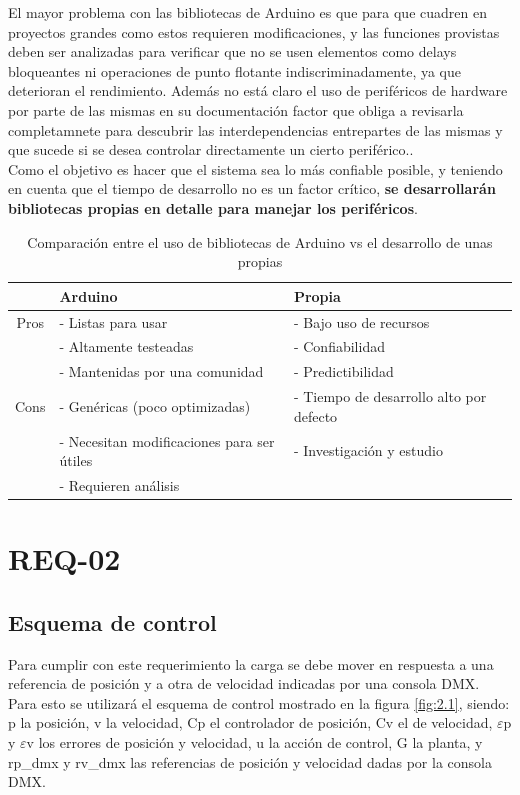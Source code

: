 El mayor problema con las bibliotecas de Arduino es que para que cuadren en proyectos grandes como estos requieren modificaciones, y las funciones provistas deben ser analizadas para verificar que no se usen elementos como delays bloqueantes ni operaciones de punto flotante indiscriminadamente, ya que deterioran el rendimiento. Además no está claro el uso de periféricos de hardware por parte de las mismas en su documentación factor que obliga a revisarla completamnete para descubrir las interdependencias entrepartes de las mismas y que sucede si se desea controlar directamente un cierto periférico.. \\
Como el objetivo es hacer que el sistema sea lo más confiable posible, y teniendo en cuenta que el tiempo de desarrollo no es un factor crítico, \textbf{se desarrollarán bibliotecas propias en detalle para manejar los periféricos}.\\

\begin{table}[!ht]
	\begin{center}
		\begin{tabular}{|c|l|l|}
			\hline
			\rowcolor{OODlightblue}
			\textbf{} & \textbf{Arduino} & \textbf{Propia} \\
			\hline \hline
			Pros & - Listas para usar & - Bajo uso de recursos \\
			& - Altamente testeadas  & - Confiabilidad \\
			& - Mantenidas por una comunidad & - Predictibilidad \\
			\hline
			Cons & - Genéricas (poco optimizadas) & - Tiempo de desarrollo alto por defecto \\
			& - Necesitan modificaciones para ser útiles & - Investigación y estudio \\
			& - Requieren análisis &   \\
			\hline
		\end{tabular}
	\end{center}
	\caption{Comparación entre el uso de bibliotecas de Arduino vs el desarrollo de unas propias}
	\label{table:\thetable}
\end{table}

\section{REQ-02} \label{sec:\thesection}
\subsection{Esquema de control}
Para cumplir con este requerimiento la carga se debe mover en respuesta a una referencia de posición y a otra de velocidad indicadas por una consola DMX. Para esto se utilizará el esquema de control mostrado en la figura \ref{fig:2.1}, siendo: p la posición, v la velocidad,  Cp el controlador de posición, Cv el de velocidad, \(\varepsilon\)p y \(\varepsilon\)v los errores de posición y velocidad, u la acción de control, G la planta, y rp\_dmx y rv\_dmx las referencias de posición y velocidad dadas por la consola DMX.

